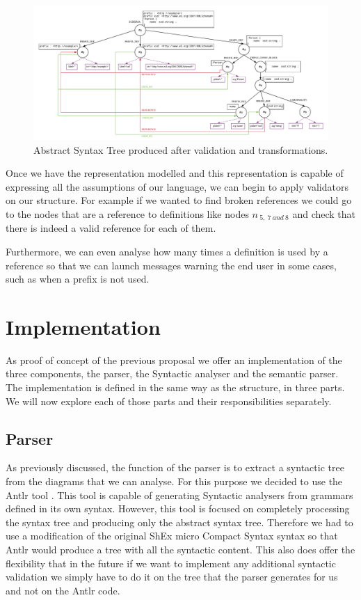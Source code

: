\begin{figure}
    \includegraphics[width=\textwidth]{images/shex-lite-sema-anal.pdf}
    \centering
    \caption[Abstract Syntax Tree produced after validation and transformations]{Abstract Syntax Tree produced after validation and
    transformations.}
    \label{fig:shex-lite-sema-anal}
\end{figure}

Once we have the representation modelled and this representation is capable of expressing all the assumptions of our language,
we can begin to apply validators on our structure. For example if we wanted to find broken references we could go to the nodes
that are a reference to definitions like nodes $n_{\:5,\:7\:and\:8}$ and check that there is indeed a valid reference for each of them.

Furthermore, we can even analyse how many times a definition is used by a reference so that we can launch messages warning the end user
in some cases, such as when a prefix is not used.

\section{Implementation}\label{sec:anal-implementation}
As proof of concept of the previous proposal we offer an implementation of the three components, the parser, the Syntactic analyser
and the semantic parser. The implementation is defined in the same way as the structure, in three parts. We will now explore each
of those parts and their responsibilities separately.

\subsection{Parser}
As previously discussed, the function of the parser is to extract a syntactic tree from the diagrams that we can analyse.
For this purpose we decided to use the Antlr tool \cite{parr1995antlr}. This tool is capable of generating Syntactic analysers
from grammars defined in its own syntax. However, this tool is focused on completely processing the syntax tree and producing
only the abstract syntax tree. Therefore we had to use a modification of the original ShEx micro Compact Syntax syntax so that
Antlr would produce a tree with all the syntactic content. This also does offer the flexibility that in the future if we want to
implement any additional syntactic validation we simply have to do it on the tree that the parser generates for
us and not on the Antlr code.

